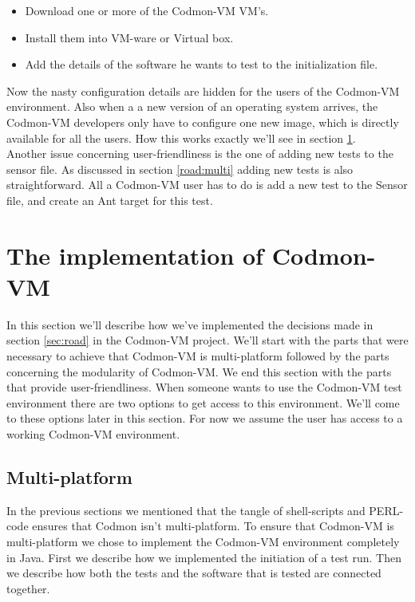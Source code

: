 \documentclass{article}
\newcommand{\project}{Codmon-VM}
\begin{document}
\begin{itemize}
\item Download one or more of the \project{} VM's.
\item Install them into VM-ware or Virtual box.
\item Add the details of the software he wants to test to the initialization file.
\end{itemize}


\noindent Now the nasty configuration details are hidden for the users of the \project{} environment. Also when a a new version of an operating system arrives, the \project{} developers only have to 
configure one new image, which is directly available for all the users. How this works exactly we'll see in section \ref{sec:Codmon2.0}. \\

\noindent Another issue concerning user-friendliness is the one of adding new tests to the sensor file. As discussed in section \ref{road:multi} adding new tests is also straightforward. All a \project{} user 
has to do is add a new test to the Sensor file, and create an Ant target for this test. 

\newpage
\section{The implementation of \project{}}
\label{sec:Codmon2.0}
In this section we'll describe how we've implemented the decisions made in section \ref{sec:road} in the \project{} project. We'll start with the parts that were necessary to achieve that \project{} is multi-platform 
followed by the parts concerning the modularity of \project{}. We end this section with the parts that provide user-friendliness. When someone wants to use the \project{} test environment there are two options  
to get access to this environment. We'll come to these options later in this section. For now we assume the user has access to a working \project{} environment.

\subsection{Multi-platform}
\label{imp:multi}
In the previous sections we mentioned that the tangle of shell-scripts and PERL-code ensures that Codmon isn't multi-platform. To ensure that \project{} is multi-platform we chose to implement the 
\project{} environment completely in Java. First we describe how we implemented the initiation of a test run. Then we describe how both the tests and the software that is tested are connected together.
\end{document}
